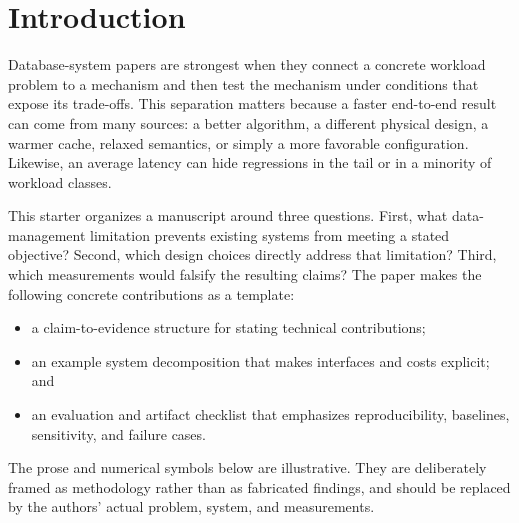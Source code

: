 \section{Introduction}

Database-system papers are strongest when they connect a concrete workload
problem to a mechanism and then test the mechanism under conditions that expose
its trade-offs.  This separation matters because a faster end-to-end result can
come from many sources: a better algorithm, a different physical design, a
warmer cache, relaxed semantics, or simply a more favorable configuration.
Likewise, an average latency can hide regressions in the tail or in a minority
of workload classes.

This starter organizes a manuscript around three questions.  First, what
data-management limitation prevents existing systems from meeting a stated
objective?  Second, which design choices directly address that limitation?
Third, which measurements would falsify the resulting claims?  The paper makes
the following concrete contributions as a template:

\begin{itemize}
  \item a claim-to-evidence structure for stating technical contributions;
  \item an example system decomposition that makes interfaces and costs
        explicit; and
  \item an evaluation and artifact checklist that emphasizes reproducibility,
        baselines, sensitivity, and failure cases.
\end{itemize}

The prose and numerical symbols below are illustrative.  They are deliberately
framed as methodology rather than as fabricated findings, and should be
replaced by the authors' actual problem, system, and measurements.
